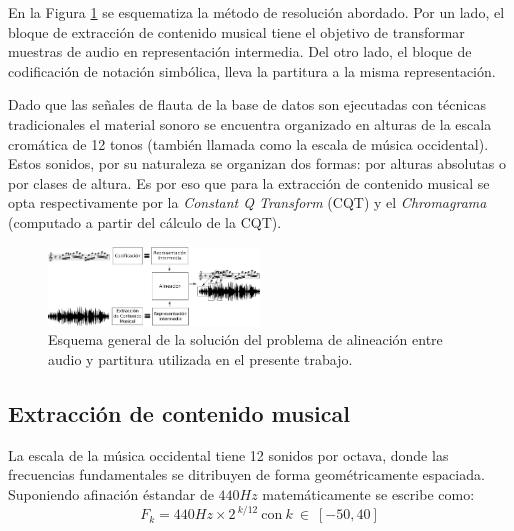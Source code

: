 \documentclass
  [ams,pdfout]%
	{aeslac}
\begin{document}
En la Figura \ref{fig:diagrama_general} se esquematiza la método de resolución abordado. Por un lado, el bloque de extracción de contenido musical tiene el objetivo de transformar muestras de audio en representación intermedia. Del otro lado, el bloque de codificación de notación simbólica, lleva la partitura a la misma representación. 

Dado que las señales de flauta de la base de datos son ejecutadas con técnicas tradicionales el material sonoro se encuentra organizado en alturas de la escala cromática de 12 tonos (también llamada como la escala de música occidental). Estos sonidos, por su naturaleza se organizan dos formas: por alturas absolutas o por clases de altura. Es por eso que para la extracción de contenido musical se opta respectivamente por la \textit{Constant Q Transform}\cite{schorkhuber2010constant} (CQT) y el \textit{Chromagrama} (computado a partir del cálculo de la CQT).

\begin{figure}[h!]
\begin{center}
\includegraphics[width=0.5\textwidth]{imagenes/diagrama_general-back} 	
\caption{Esquema general de la solución del problema de alineación entre audio y partitura utilizada en el presente trabajo.}
\label{fig:diagrama_general}
\end{center}
\end{figure}

\subsection{Extracción de contenido musical}
La escala de la música occidental tiene 12 sonidos por octava, donde las frecuencias fundamentales se ditribuyen de forma geométricamente espaciada. Suponiendo afinación éstandar de $440Hz$ matemáticamente se escribe como:
\begin{equation}
\label{eq:escalaTI}
F_k= 440Hz \times 2^{\:k/12} \: \text{con} \: k \: \in \: [-50,40]
\end{equation}
\end{document}
